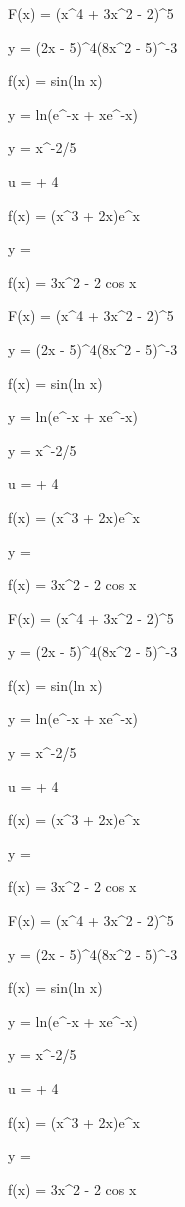 \documentclass[11pt,a4paper]{article}
\begin{document}

 F(x) = (x^4 + 3x^2 - 2)^5

 y = (2x - 5)^4(8x^2 - 5)^{-3}

 f(x) = sin(ln x)

 y = ln(e^{-x} + xe^{-x})

y = x^{-2/5}

u =  + 4

f(x) = (x^3 + 2x)e^x

y = 

f(x) = 3x^2 - 2 cos x


 F(x) = (x^4 + 3x^2 - 2)^5

 y = (2x - 5)^4(8x^2 - 5)^{-3}

 f(x) = sin(ln x)

 y = ln(e^{-x} + xe^{-x})

y = x^{-2/5}

u =  + 4

f(x) = (x^3 + 2x)e^x

y = 

f(x) = 3x^2 - 2 cos x


 F(x) = (x^4 + 3x^2 - 2)^5

 y = (2x - 5)^4(8x^2 - 5)^{-3}

 f(x) = sin(ln x)

 y = ln(e^{-x} + xe^{-x})

y = x^{-2/5}

u =  + 4

f(x) = (x^3 + 2x)e^x

y = 

f(x) = 3x^2 - 2 cos x


 F(x) = (x^4 + 3x^2 - 2)^5

 y = (2x - 5)^4(8x^2 - 5)^{-3}

 f(x) = sin(ln x)

 y = ln(e^{-x} + xe^{-x})

y = x^{-2/5}

u =  + 4

f(x) = (x^3 + 2x)e^x

y = 

f(x) = 3x^2 - 2 cos x

\end{document}
